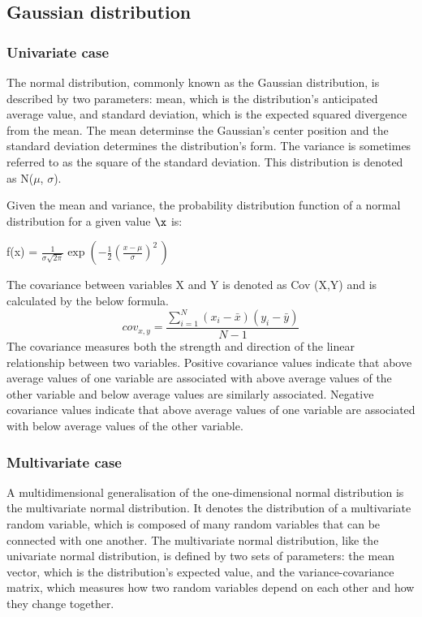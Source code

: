 

\subsection{Gaussian distribution}
\subsubsection{Univariate case}
The normal distribution, commonly known as the Gaussian distribution, is described by two parameters: mean, which is the distribution's anticipated average value, and standard deviation, which is the expected squared divergence from the mean. The mean determinse the Gaussian's center position and the standard deviation determines the distribution's form.  The variance is sometimes referred to as the square of the standard deviation. This distribution is denoted as N($\mu$, $\sigma$).

Given the mean and variance, the probability distribution function of a normal distribution for a given value $\x$ is:

f(x) = $\frac{1}{\sigma\sqrt{2\pi}} 
\exp\left( -\frac{1}{2}\left(\frac{x-\mu}{\sigma}\right)^{\!2}\,\right)$

The covariance between variables X and Y is denoted as Cov (X,Y) and is calculated by the below formula. 
$$cov_{x,y}=\frac{\sum_{i=1}^{N}(x_{i}-\bar{x})(y_{i}-\bar{y})}{N-1}$$
The covariance measures both the strength and direction of the linear relationship between two variables. Positive covariance values indicate that above average values of one variable are associated with above average values of the other variable and below average values are similarly associated. Negative covariance values indicate that above average values of one variable are associated with below average values of the other variable.

\subsubsection{Multivariate case}

\noindent A multidimensional generalisation of the one-dimensional normal distribution is the multivariate normal distribution. It denotes the distribution of a multivariate random variable, which is composed of many random variables that can be connected with one another. The multivariate normal distribution, like the univariate normal distribution, is defined by two sets of parameters: the mean vector, which is the distribution's expected value, and the variance-covariance matrix, which measures how two random variables depend on each other and how they change together.

